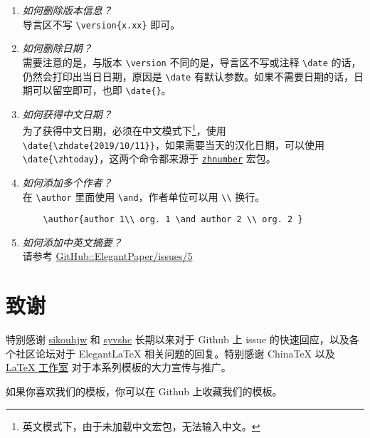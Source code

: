 \documentclass[lang=cn,a4paper]{elegantpaper}
\begin{document}
\begin{enumerate}[label=\arabic*).]
  \item \textit{如何删除版本信息？}\\
    导言区不写 \lstinline|\version{x.xx}| 即可。
  \item \textit{如何删除日期？}\\
    需要注意的是，与版本 \lstinline{\version} 不同的是，导言区不写或注释 \lstinline{\date} 的话，仍然会打印出当日日期，原因是 \lstinline{\date} 有默认参数。如果不需要日期的话，日期可以留空即可，也即 \lstinline|\date{}|。
  \item \textit{如何获得中文日期？}\\
    为了获得中文日期，必须在中文模式下\footnote{英文模式下，由于未加载中文宏包，无法输入中文。}，使用 \lstinline|\date{\zhdate{2019/10/11}}|，如果需要当天的汉化日期，可以使用 \lstinline|\date{\zhtoday}|，这两个命令都来源于 \href{https://ctan.org/pkg/zhnumber}{\lstinline{zhnumber}} 宏包。
  \item \textit{如何添加多个作者？}\\
    在 \lstinline{\author} 里面使用 \lstinline{\and}，作者单位可以用 \lstinline{\\} 换行。
    \begin{lstlisting}
    \author{author 1\\ org. 1 \and author 2 \\ org. 2 }
    \end{lstlisting}
  \item \textit{如何添加中英文摘要？}\\
    请参考 \href{https://github.com/ElegantLaTeX/ElegantPaper/issues/5}{GitHub::ElegantPaper/issues/5}
\end{enumerate}


\section{致谢}

特别感谢 \href{https://github.com/sikouhjw}{sikouhjw} 和 \href{https://github.com/syvshc}{syvshc}  长期以来对于 Github 上 issue 的快速回应，以及各个社区论坛对于 ElegantLaTeX 相关问题的回复。特别感谢 ChinaTeX 以及 \href{http://www.latexstudio.net/}{LaTeX 工作室} 对于本系列模板的大力宣传与推广。

如果你喜欢我们的模板，你可以在 Github 上收藏我们的模板。

\nocite{*}
\printbibliography[heading=bibintoc, title=\ebibname]

\appendix
\addappheadtotoc
\end{document}
